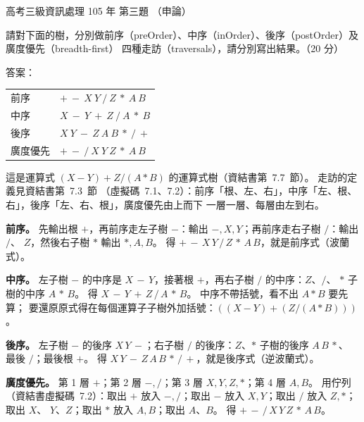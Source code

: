 \begin{pastexam}[label={px:gk3-105-ds-03}]{高考三級資訊處理 105 年 第三題}
（申論）

請對下面的樹，分別做前序（preOrder）、中序（inOrder）、後序（postOrder）及廣度優先（breadth-first）
四種走訪（traversals），請分別寫出結果。（20 分）
\begin{center}
\end{center}
\end{pastexam}

\begin{pastsoln}
答案：
\begin{center}
\begin{tabular}{ll}
\toprule
前序 & $+\ -\ X\ Y\ /\ Z\ *\ A\ B$ \\
中序 & $X\ -\ Y\ +\ Z\ /\ A\ *\ B$ \\
後序 & $X\ Y\ -\ Z\ A\ B\ *\ /\ +$ \\
廣度優先 & $+\ -\ /\ X\ Y\ Z\ *\ A\ B$ \\
\bottomrule
\end{tabular}
\end{center}

這是運算式 $(X - Y) + Z / (A * B)$ 的運算式樹（資結書第~7.7~節）。 走訪的定義見資結書第~7.3~節
（虛擬碼~7.1、7.2）：前序「根、左、右」，中序「左、根、右」，後序「左、右、根」，廣度優先由上而下
一層一層、每層由左到右。

\textbf{前序。} 先輸出根 $+$，再前序走左子樹 $-$：輸出 $-, X, Y$；再前序走右子樹 $/$：輸出 $/$、
$Z$，然後右子樹 $*$ 輸出 $*, A, B$。 得 $+\,-\,X\,Y\,/\,Z\,*\,A\,B$，就是前序式（波蘭式）。

\textbf{中序。} 左子樹 $-$ 的中序是 $X\,-\,Y$，接著根 $+$，再右子樹 $/$ 的中序：$Z$、$/$、
$*$ 子樹的中序 $A\,*\,B$。 得 $X\,-\,Y\,+\,Z\,/\,A\,*\,B$。 中序不帶括號，看不出 $A * B$ 要先算；
要還原原式得在每個運算子子樹外加括號：$((X - Y) + (Z / (A * B)))$。

\textbf{後序。} 左子樹 $-$ 的後序 $X\,Y\,-$；右子樹 $/$ 的後序：$Z$、$*$ 子樹的後序 $A\,B\,*$、
最後 $/$；最後根 $+$。 得 $X\,Y\,-\,Z\,A\,B\,*\,/\,+$，就是後序式（逆波蘭式）。

\textbf{廣度優先。} 第 1 層 $+$；第 2 層 $-, /$；第 3 層 $X, Y, Z, *$；第 4 層 $A, B$。 用佇列
（資結書虛擬碼~7.2）：取出 $+$ 放入 $-, /$；取出 $-$ 放入 $X, Y$；取出 $/$ 放入 $Z, *$；取出 $X$、
$Y$、$Z$；取出 $*$ 放入 $A, B$；取出 $A$、$B$。 得 $+\,-\,/\,X\,Y\,Z\,*\,A\,B$。
\end{pastsoln}
